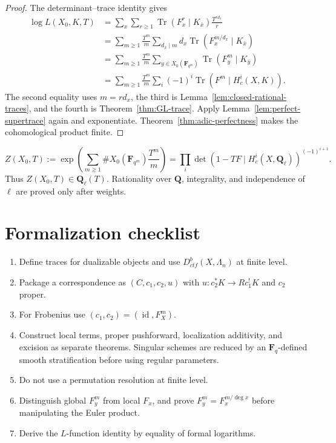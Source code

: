 \begin{proof}
The determinant--trace identity gives
\[
\begin{aligned}
\log L(X_0,K,T)
 &=\sum_x\sum_{r\geq1}
   \operatorname{Tr}(F_x^r\mid K_{\bar x})\frac{T^{rd_x}}r\\
 &=\sum_{m\geq1}\frac{T^m}{m}
   \sum_{d_x\mid m}d_x
   \operatorname{Tr}(F_x^{m/d_x}\mid K_{\bar x})\\
 &=\sum_{m\geq1}\frac{T^m}{m}
   \sum_{y\in X_0(\mathbf F_{q^m})}
   \operatorname{Tr}(F_y^m\mid K_{\bar y})\\
 &=\sum_{m\geq1}\frac{T^m}{m}
   \sum_i(-1)^i\operatorname{Tr}
   (F^m\mid H_c^i(X,K)).
\end{aligned}
\]
The second equality uses \(m=rd_x\), the third is
Lemma~\ref{lem:closed-rational-traces}, and the fourth is
Theorem~\ref{thm:GL-trace}.  Apply Lemma~\ref{lem:perfect-supertrace} again
and exponentiate.  Theorem~\ref{thm:adic-perfectness} makes the
cohomological product finite.
\end{proof}

\begin{corollary}
\label{cor:zeta-cohomological}
\[
 Z(X_0,T)
 :=\exp\left(\sum_{m\geq1}
 \#X_0(\mathbf F_{q^m})\frac{T^m}{m}\right)
 =
 \prod_i\det(1-TF\mid H_c^i(X,\mathbf Q_\ell))^{(-1)^{i+1}}.
\]
Thus \(Z(X_0,T)\in\mathbf Q_\ell(T)\).  Rationality over \(\mathbf Q\),
integrality, and independence of \(\ell\) are proved only after weights.
\end{corollary}

\section{Formalization checklist}

\begin{enumerate}
\item Define traces for dualizable objects and use
\(D^b_{ctf}(X,\Lambda_n)\) at finite level.
\item Package a correspondence as \((C,c_1,c_2,u)\) with
\(u:c_2^*K\to Rc_1^!K\) and \(c_2\) proper.
\item For Frobenius use
\((c_1,c_2)=(\operatorname{id},F_X^m)\).
\item Construct local terms, proper pushforward, localization additivity, and
excision as separate theorems.  Singular schemes are reduced by an
\(\mathbf F_q\)-defined smooth stratification before using regular parameters.
\item Do not use a permutation resolution at finite level.
\item Distinguish global \(F_y^m\) from local \(F_x\), and prove
\(F_y^m=F_x^{m/\deg x}\) before manipulating the Euler product.
\item Derive the \(L\)-function identity by equality of formal logarithms.
\end{enumerate}

